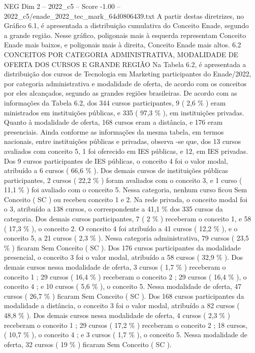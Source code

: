 \begin{textsample}{NEG Dim 2 – 2022\_c5 – Score -1.00 – 2022\_c5/enade\_2022\_tec\_mark\_64d0806439.txt}
A partir destas diretrizes, no Gráfico 6.1, é apresentada a distribuição cumulativa do Conceito Enade, segundo a grande região.
Nesse gráfico, poligonais mais à esquerda representam Conceito Enade mais baixos, e poligonais mais à direita, Conceito Enade mais altos. 6.2 CONCEITOS POR CATEGORIA ADMINISTRATIVA, MODALIDADE DE OFERTA DOS CURSOS E GRANDE REGIÃO Na Tabela 6.2, é apresentada a distribuição dos cursos de Tecnologia em Marketing participantes do Enade/2022, por categoria administrativa e modalidade de oferta, de acordo com os conceitos por eles alcançados, segundo as grandes regiões brasileiras.
De acordo com as informações da Tabela 6.2, dos 344 cursos participantes, 9 ( 2,6 \% ) eram ministrados em instituições públicas, e 335 ( 97,3 \% ), em instituições privadas.
Quanto à modalidade de oferta, 168 cursos eram a distância, e 176 eram presenciais.
Ainda conforme as informações da mesma tabela, em termos nacionais, entre instituições públicas e privadas, observa -se que, dos 13 cursos avaliados com conceito 5, 1 foi oferecido em IES públicas, e 12, em IES privadas.
Dos 9 cursos participantes de IES públicas, o conceito 4 foi o valor modal, atribuído a 6 cursos ( 66,6 \% ).
Dos demais cursos de instituições públicas participantes, 2 cursos ( 22,2 \% ) foram avaliados com o conceito 3, e 1 curso ( 11,1 \% ) foi avaliado com o conceito 5.
Nessa categoria, nenhum curso ficou Sem Conceito ( SC ) ou recebeu conceito 1 e 2.
Na rede privada, o conceito modal foi o 3, atribuído a 138 cursos, o correspondente a 41,1 \% dos 335 cursos da categoria.
Dos demais cursos participantes, 7 ( 2 \% ) receberam o conceito 1, e 58 ( 17,3 \% ), o conceito 2.
O conceito 4 foi atribuído a 41 cursos ( 12,2 \% ), e o conceito 5, a 21 cursos ( 2,3 \% ).
Nessa categoria administrativa, 79 cursos ( 23,5 \% ) ficaram Sem Conceito ( SC ).
Dos 176 cursos participantes da modalidade presencial, o conceito 3 foi o valor modal, atribuído a 58 cursos ( 32,9 \% ).
Dos demais cursos nessa modalidade de oferta, 3 cursos ( 1,7 \% ) receberam o conceito 1 ; 29 cursos ( 16,4 \% ) receberam o conceito 2 ; 29 cursos ( 16,4 \% ), o conceito 4 ; e 10 cursos ( 5,6 \% ), o conceito 5.
Nessa modalidade de oferta, 47 cursos ( 26,7 \% ) ficaram Sem Conceito ( SC ).
Dos 168 cursos participantes da modalidade a distância, o conceito 3 foi o valor modal, atribuído a 82 cursos ( 48,8 \% ).
Dos demais cursos nessa modalidade de oferta, 4 cursos ( 2,3 \% ) receberam o conceito 1 ; 29 cursos ( 17,2 \% ) receberam o conceito 2 ; 18 cursos, ( 10,7 \% ), o conceito 4 ; e 3 cursos ( 1,7 \% ), o conceito 5.
Nessa modalidade de oferta, 32 cursos ( 19 \% ) ficaram Sem Conceito ( SC ).

\end{textsample}
